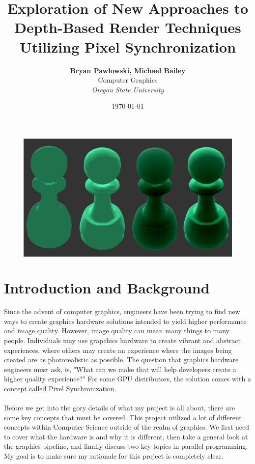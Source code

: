 \documentclass[a4paper, 12pt]{article}
\title{\textbf{Exploration of New Approaches to Depth-Based Render Techniques Utilizing Pixel Synchronization}}
\date{\today}
\author{\textbf{Bryan Pawlowski, Michael Bailey} \\ Computer Graphics \\ \textit{Oregon State University}}
\begin{document}
\begin{titlepage}
\maketitle
\begin{figure}[h]
	\centering
	\includegraphics[width=1.0\textwidth]{CloseResult.jpg}
\end{figure}
\thispagestyle{empty}
\end{titlepage}

\tableofcontents
\pagebreak


\section{Introduction and Background} 

Since the advent of computer graphics, engineers have been trying to find new
ways to create graphics hardware solutions intended to yield higher
performance and image quality. However, image quality can mean many things to
many people. Individuals may use grapchics hardware to create vibrant and
abstract experiences, where others may create an experience where the images
being created are as photorealistic as possible. The question that graphics
hardware engineers must ask, is, "What can we make that will help developers
create a higher quality experience?" For some GPU distributors, the solution
comes with a concept called Pixel Synchronization. \\ \\ Before we get into
the gory details of what my project is all about, there are some key concepts
that must be covered. This project utilized a lot of different concepts within
Computer Science outside of the realm of graphics. We first need to cover what
the hardware is and why it is different, then take a general look at the
graphics pipeline, and finally discuss two key topics in parallel programming.
My goal is to make sure my rationale for this project is completely clear.
\end{document}
